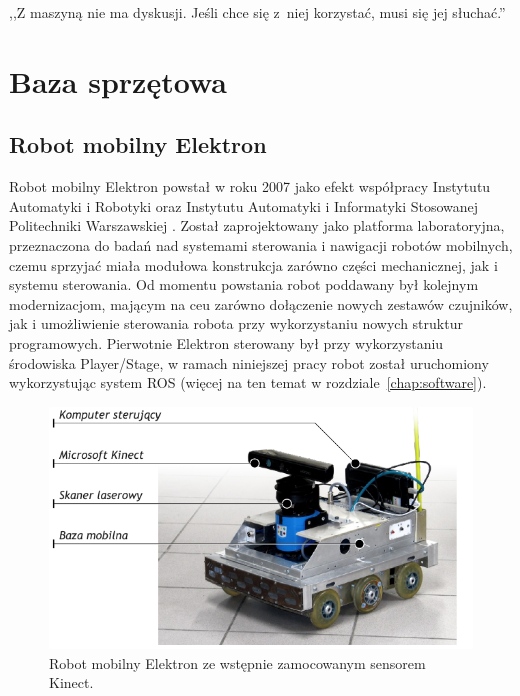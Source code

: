 

\begin{savequote}[70mm]
,,Z maszyną nie ma dyskusji. Jeśli chce się z~niej korzystać, musi się jej słuchać.''
\end{savequote}


\chapter{Baza sprzętowa}
\label{chap:sprzet}


\section{Robot mobilny Elektron}

Robot mobilny Elektron powstał w roku 2007 jako efekt współpracy Instytutu Automatyki
i Robotyki oraz Instytutu Automatyki i Informatyki Stosowanej Politechniki Warszawskiej
\cite{SzynkiewiczEtal06}. Został zaprojektowany jako platforma laboratoryjna,
przeznaczona do badań nad systemami sterowania i nawigacji robotów mobilnych,
czemu sprzyjać miała modułowa konstrukcja zarówno części mechanicznej, jak i systemu
sterowania. Od momentu powstania robot poddawany był kolejnym modernizacjom,
mającym na ceu zarówno dołączenie nowych zestawów czujników, jak i umożliwienie
sterowania robota przy wykorzystaniu nowych struktur programowych. Pierwotnie Elektron
sterowany był przy wykorzystaniu środowiska Player/Stage, w ramach niniejszej pracy
robot został uruchomiony wykorzystując system ROS (więcej na ten temat w
rozdziale~\ref{chap:software}).


\begin{figure}[h!]
\centering
\includegraphics{../../Common/img/elektron/elektron_desc}
\caption[Robot mobilny Elektron]{Robot mobilny Elektron ze wstępnie zamocowanym
sensorem Kinect.}
\label{fig:elektron}
\end{figure}

